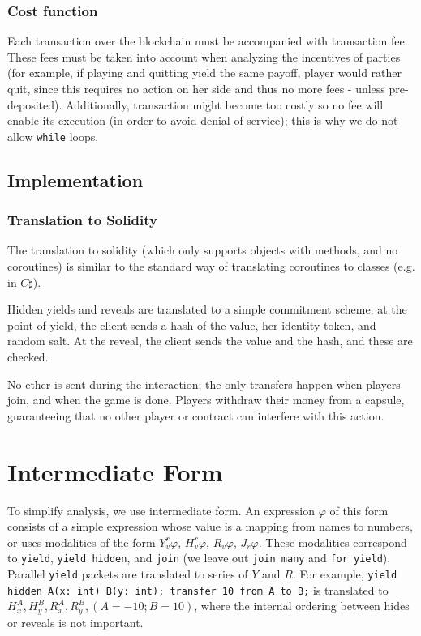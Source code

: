 \documentclass[acmsmall,review,anonymous]{acmart}\settopmatter{printfolios=true,printccs=false,printacmref=false}
\begin{document}
\subsubsection{Cost function}
Each transaction over the blockchain must be accompanied with transaction fee. These fees must be taken into account when analyzing the incentives of parties (for example, if playing and quitting yield the same payoff, player would rather quit, since this requires no action on her side and thus no more fees - unless pre-deposited). Additionally, transaction might become too costly so no fee will enable its execution (in order to avoid denial of service); this is why we do not allow \texttt{while} loops.

\subsection{Implementation}
\subsubsection{Translation to Solidity}
The translation to solidity (which only supports objects with methods, and no coroutines) is similar to the standard way of translating coroutines to classes (e.g. in $C\sharp$). 

Hidden yields and reveals are translated to a simple commitment scheme: at the point of yield, the client sends a hash of the value, her identity token, and random salt. At the reveal, the client sends the value and the hash, and these are checked.

No ether is sent during the interaction; the only transfers happen when players join, and when the game is done. Players withdraw their money from a capsule, guaranteeing that no other player or contract can interfere with this action.

\section{Intermediate Form}
To simplify analysis, we use intermediate form. An expression $\varphi$ of this form consists of a simple expression whose value is a mapping from names to numbers, or uses modalities of the form $Y^r_v\varphi$, $H^r_v\varphi$, $R_v\varphi$, $J_r\varphi$. These modalities correspond to \texttt{yield}, \texttt{yield hidden}, and \texttt{join} (we leave out \texttt{join many} and \texttt{for yield}). Parallel \texttt{yield} packets are translated to series of $Y$ and $R$. For example, \texttt{yield hidden A(x: int) B(y: int); transfer 10 from A to B;} is translated to $H^A_x, H^B_y, R^A_x, R^B_y, (A=-10; B=10)$, where the internal ordering between hides or reveals is not important.
\end{document}
